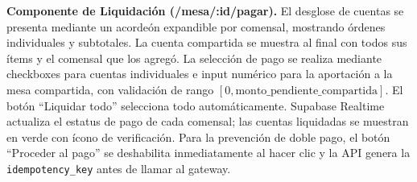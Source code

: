 \medskip

\noindent\textbf{Componente de Liquidación (/mesa/:id/pagar).} El desglose de
cuentas se presenta mediante un acordeón expandible por comensal, mostrando
órdenes individuales y subtotales. La cuenta compartida se muestra al final con
todos sus ítems y el comensal que los agregó. La selección de pago se realiza
mediante checkboxes para cuentas individuales e input numérico para la aportación
a la mesa compartida, con validación de rango $[0, \text{monto\_pendiente\_compartida}]$.
El botón ``Liquidar todo'' selecciona todo automáticamente. Supabase Realtime
actualiza el estatus de pago de cada comensal; las cuentas liquidadas se muestran
en verde con ícono de verificación. Para la prevención de doble pago, el botón
``Proceder al pago'' se deshabilita inmediatamente al hacer clic y la API genera
la \texttt{idempotency\_key} antes de llamar al gateway.

\newpage
